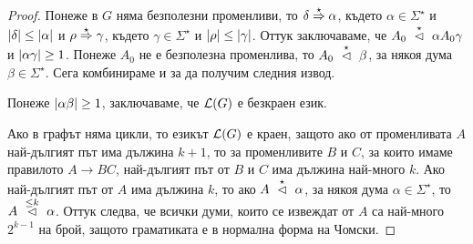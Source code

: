 \begin{proof}
  Понеже в $G$ няма безполезни променливи, то $\delta \derive{\star} \alpha$, където $\alpha \in \Sigma^\star$ и $\abs{\delta} \leq \abs{\alpha}$ и $\rho \derive{\star} \gamma$,
  където $\gamma \in \Sigma^\star$ и $\abs{\rho} \leq \abs{\gamma}$.
  Оттук заключаваме, че $A_0 \yield{\star} \alpha A_0 \gamma$ и $\abs{\alpha\gamma} \geq 1$.
  Понеже $A_0$ не е безполезна променлива, то $A_0 \yield{\star} \beta$, за някоя дума $\beta \in \Sigma^\star$.
  Сега комбинираме  и  за да получим следния извод.
  \begin{prooftree}
  \end{prooftree}
  Понеже $\abs{\alpha\beta} \geq 1$, заключаваме, че $\L(G)$ е безкраен език.
  
  Ако в графът няма цикли, то езикът $\L(G)$ е краен, защото ако от променливата $A$ най-дългият път има дължина $k+1$,
  то за променливите $B$ и $C$, за които имаме правилото $A\to BC$, най-дългият път от $B$ и $C$ има дължина най-много $k$.
  Ако най-дългият път от $A$ има дължина $k$, то ако $A \yield{\star} \alpha$, за някоя дума $\alpha \in \Sigma^\star$,
  то $A \yield{\leq k} \alpha$. Оттук следва, че всички думи, които се извеждат от $A$ са най-много $2^{k-1}$ на брой,
  защото граматиката е в нормална форма на Чомски.
\end{proof}


